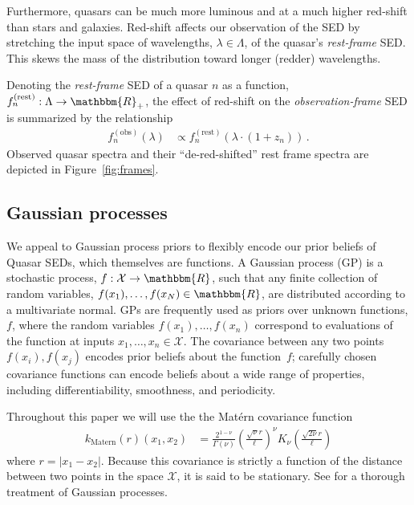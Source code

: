 \documentclass{article}
\newcommand{\R}{\mathbbm{R}}
\newcommand{\mcX}{\mathcal{X}}
\begin{document}
Furthermore, quasars can be much more luminous and at a much higher red-shift than stars and galaxies.  
Red-shift affects our observation of the SED by stretching the input space of wavelengths, $\lambda \in \Lambda$, of the quasar's \emph{rest-frame} SED.  
This skews the mass of the distribution toward longer (redder) wavelengths. 

Denoting the \emph{rest-frame} SED of a quasar $n$ as a function, $f_n^{(\text{rest})} : \Lambda \rightarrow \R_+$, the effect of red-shift on the \emph{observation-frame} SED is summarized by the relationship 
\begin{align}
  f_n^{(\text{obs})}(\lambda) &\propto f_n^{(\text{rest})}(\lambda \cdot (1 + z_n)) \, .
\end{align}
Observed quasar spectra and their ``de-red-shifted'' rest frame spectra are depicted in Figure~\ref{fig:frames}.

\subsection{Gaussian processes}
We appeal to Gaussian process priors to flexibly encode our prior beliefs of Quasar SEDs, which themselves are functions. A Gaussian process (GP) is a stochastic process, $f: \mathcal{X} \rightarrow \R$, such that any finite collection of random variables, ${f(x_1),\dots, f(x_N) \in \R}$, are distributed according to a multivariate normal.  
GPs are frequently used as priors over unknown functions, $f$, where the random variables $f(x_1), \dots, f(x_n)$ correspond to evaluations of the function at inputs $x_1, \dots, x_n \in \mcX$.  
The covariance between any two points $f(x_i), f(x_j)$ encodes prior beliefs about the function~$f$; carefully chosen covariance functions can encode beliefs about a wide range of properties, including differentiability, smoothness, and periodicity.  

Throughout this paper we will use the the Mat\'{e}rn \cite{Matern1986spatial} covariance function
\begin{align}
  k_{\text{Matern}}(r)(x_1, x_2) 
    &= \frac{2^{1-\nu}}{\Gamma(\nu)} 
       \left( \frac{\sqrt{\nu} r}{\ell} \right) ^\nu
       K_\nu\left( \frac{\sqrt{2\nu} r}{\ell}\right)
\end{align}
where $r = |x_1 - x_2|$.  Because this covariance is strictly a function of the distance between two points in the space $\mcX$, it is said to be stationary. 
See \cite{rasmussen2006gaussian} for a thorough treatment of Gaussian processes.  
\end{document}
